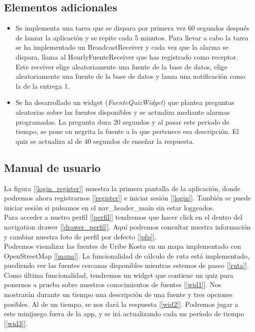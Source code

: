 \documentclass[11pt,a4paper]{article}
\begin{document}
\subsection{Elementos adicionales}
\begin{itemize}
  \item Se implementa una tarea que se dispara por primera vez 60 segundos después de lanzar la aplicación y se repite cada 5 minutos. Para llevar a cabo la tarea se ha implementado un BroadcastReceiver y cada vez que la alarma se dispara, llama al HourlyFuenteReceiver que has registrado como receptor. Este receiver elige aleatoriamente una fuente de la base de datos, elige aleatoriamente una fuente de la base de datos y lanza una notificación como la de la entrega 1.
  \item Se ha desarrollado un widget (\textit{FuenteQuizWidget}) que plantea preguntas aleatorias sobre las fuentes disponibles y se actualiza mediante alarmas programadas. La pregunta dura 20 segundos y al pasar este periodo de tiempo, se pone en negrita la fuente a la que pertenece esa descripción. El quiz se actualiza al de 40 segundos de enseñar la respuesta.
\end{itemize}

\newpage
\subsection{Manual de usuario}
La figura [\ref{login_register}] muestra la primera pantalla de la aplicación, donde podremos ahora registrarnos [\ref{register}] e iniciar sesión [\ref{login}]. También se puede iniciar sesión si pulsamos en el nav\_header\_main sin estar loggeados.\\

Para acceder a nuetro perfil [\ref{perfil}] tendremos que hacer click en el dentro del navigation drawer [\ref{drawer_perfil}]. Aquí podremos consultar nuestra información y cambiar nuestra foto de perfil por defecto [\ref{pfp}].\\

Podremos visualizar las fuentes de Uribe Kosta en un mapa implementado con OpenStreetMap [\ref{mapa}]. La funcionalidad de cálculo de ruta está implementado, puediendo ver las fuentes cercanas disponibles mientras estemos de paseo [\ref{ruta}]. \\

Como última funcionalidad, tendremos un widget que contiene un quiz para ponernos a prueba sobre nuestros conocimientos de fuentes [\ref{wid1}]. Nos mostrarán durante un tiempo una descripción de una fuente y tres opciones posibles. Al de un tiempo, se nos dará la respuesta [\ref{wid2}]. Podremos jugar a este minijuego fuera de la app, y se irá actualizando cada un período de tiempo [\ref{wid3}].
\end{document}
